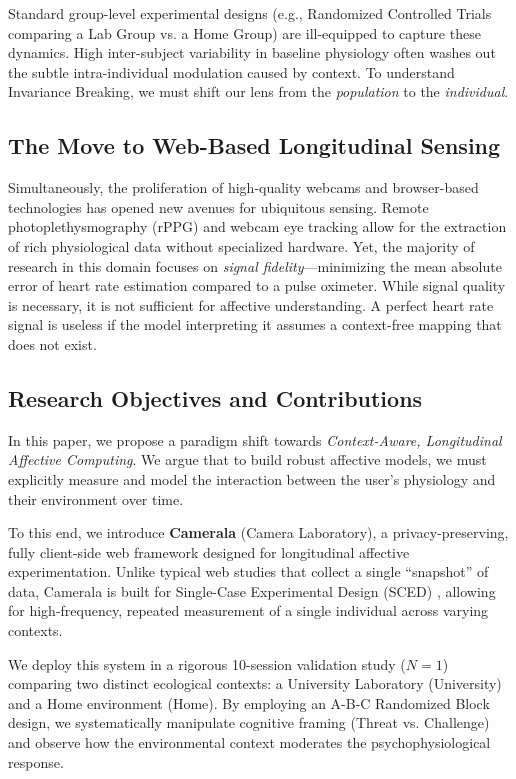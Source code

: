 Standard group-level experimental designs (e.g., Randomized Controlled Trials comparing a Lab Group vs. a Home Group) are ill-equipped to capture these dynamics. High inter-subject variability in baseline physiology often washes out the subtle intra-individual modulation caused by context. To understand Invariance Breaking, we must shift our lens from the \textit{population} to the \textit{individual}.

\subsection{The Move to Web-Based Longitudinal Sensing}
Simultaneously, the proliferation of high-quality webcams and browser-based technologies has opened new avenues for ubiquitous sensing. Remote photoplethysmography (rPPG) \cite{mcduff_rppg} and webcam eye tracking \cite{webgazer} allow for the extraction of rich physiological data without specialized hardware. Yet, the majority of research in this domain focuses on \textit{signal fidelity}—minimizing the mean absolute error of heart rate estimation compared to a pulse oximeter. While signal quality is necessary, it is not sufficient for affective understanding. A perfect heart rate signal is useless if the model interpreting it assumes a context-free mapping that does not exist.

\subsection{Research Objectives and Contributions}
In this paper, we propose a paradigm shift towards \textit{Context-Aware, Longitudinal Affective Computing}. We argue that to build robust affective models, we must explicitly measure and model the interaction between the user's physiology and their environment over time.

To this end, we introduce \textbf{Camerala} (Camera Laboratory), a privacy-preserving, fully client-side web framework designed for longitudinal affective experimentation. Unlike typical web studies that collect a single ``snapshot'' of data, Camerala is built for Single-Case Experimental Design (SCED) \cite{barlow_sced}, allowing for high-frequency, repeated measurement of a single individual across varying contexts.

We deploy this system in a rigorous 10-session validation study ($N=1$) comparing two distinct ecological contexts: a University Laboratory (University) and a Home environment (Home). By employing an A-B-C Randomized Block design, we systematically manipulate cognitive framing (Threat vs. Challenge) and observe how the environmental context moderates the psychophysiological response.

